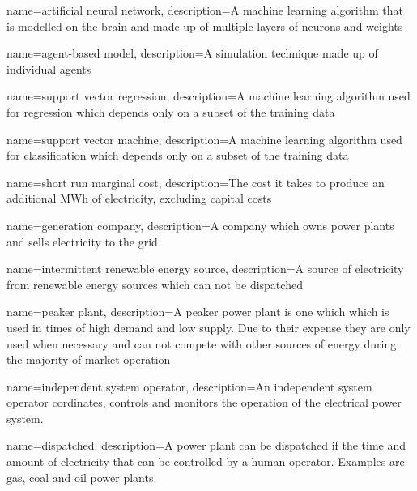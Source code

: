 {
        name=artificial neural network,
        description={A machine learning algorithm that is modelled on the brain and made up of multiple layers of neurons and weights}
}



{
        name=agent-based model,
        description={A simulation technique made up of individual agents}
}




{
        name=support vector regression,
        description={A machine learning algorithm used for regression which depends only on a subset of the training data}
}




{
	name=support vector machine,
	description={A machine learning algorithm used for classification which depends only on a subset of the training data}
}






{
	name=short run marginal cost,
	description={The cost it takes to produce an additional MWh of electricity, excluding capital costs}
}



{
	name=generation company,
	description={A company which owns power plants and sells electricity to the grid}
}




{
	name=intermittent renewable energy source,
	description={A source of electricity from renewable energy sources which can not be dispatched}
}


{
	name=peaker plant,
	description={A peaker power plant is one which which is used in times of high demand and low supply. Due to their expense they are only used when necessary and can not compete with other sources of energy during the majority of market operation}
}


{
	name=independent system operator,
	description={An independent system operator cordinates, controls and monitors the operation of the electrical power system.}
}


{
	name=dispatched,
	description={A power plant can be dispatched if the time and amount of electricity that can be controlled by a human operator. Examples are gas, coal and oil power plants.}
}

